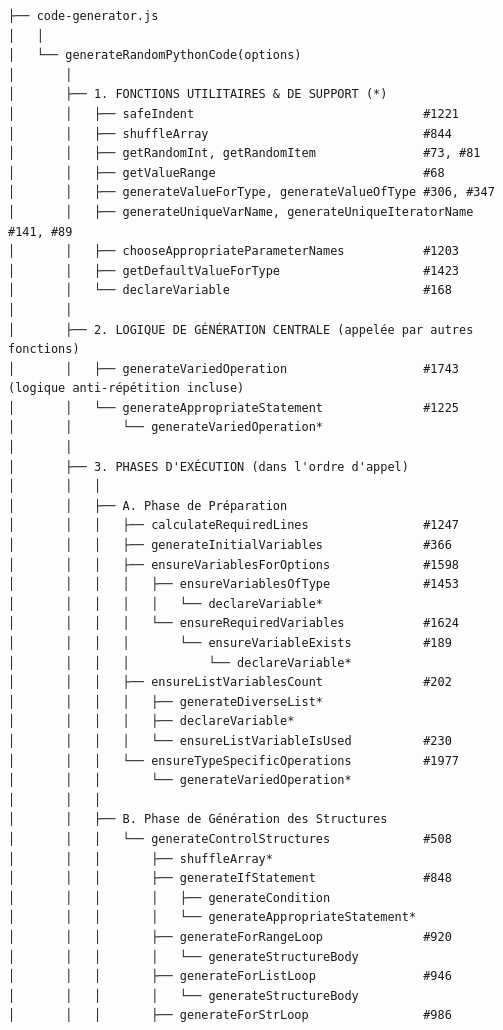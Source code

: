 \documentclass[11pt,a4paper]{article}
\begin{document}
\begin{verbatim}
├── code-generator.js
│   │
│   └── generateRandomPythonCode(options)
│       │
│       ├── 1. FONCTIONS UTILITAIRES & DE SUPPORT (*)
│       │   ├── safeIndent                                #1221
│       │   ├── shuffleArray                              #844
│       │   ├── getRandomInt, getRandomItem               #73, #81
│       │   ├── getValueRange                             #68
│       │   ├── generateValueForType, generateValueOfType #306, #347
│       │   ├── generateUniqueVarName, generateUniqueIteratorName #141, #89
│       │   ├── chooseAppropriateParameterNames           #1203
│       │   ├── getDefaultValueForType                    #1423
│       │   └── declareVariable                           #168
│       │
│       ├── 2. LOGIQUE DE GÉNÉRATION CENTRALE (appelée par autres fonctions)
│       │   ├── generateVariedOperation                   #1743 (logique anti-répétition incluse)
│       │   └── generateAppropriateStatement              #1225
│       │       └── generateVariedOperation*
│       │
│       ├── 3. PHASES D'EXÉCUTION (dans l'ordre d'appel)
│       │   │
│       │   ├── A. Phase de Préparation
│       │   │   ├── calculateRequiredLines                #1247
│       │   │   ├── generateInitialVariables              #366
│       │   │   ├── ensureVariablesForOptions             #1598
│       │   │   │   ├── ensureVariablesOfType             #1453
│       │   │   │   │   └── declareVariable*
│       │   │   │   └── ensureRequiredVariables           #1624
│       │   │   │       └── ensureVariableExists          #189
│       │   │   │           └── declareVariable*
│       │   │   ├── ensureListVariablesCount              #202
│       │   │   │   ├── generateDiverseList*
│       │   │   │   ├── declareVariable*
│       │   │   │   └── ensureListVariableIsUsed          #230
│       │   │   └── ensureTypeSpecificOperations          #1977
│       │   │       └── generateVariedOperation*
│       │   │
│       │   ├── B. Phase de Génération des Structures
│       │   │   └── generateControlStructures             #508
│       │   │       ├── shuffleArray*
│       │   │       ├── generateIfStatement               #848
│       │   │       │   ├── generateCondition
│       │   │       │   └── generateAppropriateStatement*
│       │   │       ├── generateForRangeLoop              #920
│       │   │       │   └── generateStructureBody
│       │   │       ├── generateForListLoop               #946
│       │   │       │   └── generateStructureBody
│       │   │       ├── generateForStrLoop                #986

\end{verbatim}
\end{document}
